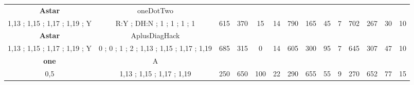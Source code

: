 \begin{table}[]
{\begin{tabular}{|c|c|c|c|c|c|c|c|c|c|c|c|c|c|}
\cellcolor{blue!15}\textbf{Astar} & oneDotTwo& {\color[HTML]{00009B} } & {\color[HTML]{9A0000} } & {\color[HTML]{009901} } &  & {\color[HTML]{00009B} } & {\color[HTML]{9A0000} } & {\color[HTML]{009901} } &  & {\color[HTML]{00009B} } & {\color[HTML]{9A0000} } & {\color[HTML]{009901} } &  \\ 
\cellcolor{ blue!15}1,13 ; 1,15 ; 1,17 ; 1,19 ; Y & R:Y ; DH:N ; 1 ; 1 ; 1 ; 1 & \multirow{-2}{*}{{\color[HTML]{00009B} 615}} & \multirow{-2}{*}{{\color[HTML]{9A0000} 370}} & \multirow{-2}{*}{{\color[HTML]{009901} 15}} & \multirow{-2}{*}{14} & \multirow{-2}{*}{{\color[HTML]{00009B} 790}} & \multirow{-2}{*}{{\color[HTML]{9A0000} 165}} & \multirow{-2}{*}{{\color[HTML]{009901} 45}} & \multirow{-2}{*}{7} & \multirow{-2}{*}{{\color[HTML]{00009B} 702}} & \multirow{-2}{*}{{\color[HTML]{9A0000} 267}} & \multirow{-2}{*}{{\color[HTML]{009901} 30}} & \multirow{-2}{*}{10} \\ \hline

\cellcolor{blue!15}\textbf{Astar} & AplusDiagHack& {\color[HTML]{00009B} } & {\color[HTML]{9A0000} } & {\color[HTML]{009901} } &  & {\color[HTML]{00009B} } & {\color[HTML]{9A0000} } & {\color[HTML]{009901} } &  & {\color[HTML]{00009B} } & {\color[HTML]{9A0000} } & {\color[HTML]{009901} } &  \\ 
\cellcolor{ blue!15}1,13 ; 1,15 ; 1,17 ; 1,19 ; Y & 0 ; 0 ; 1 ; 2 ; 1,13 ; 1,15 ; 1,17 ; 1,19 & \multirow{-2}{*}{{\color[HTML]{00009B} 685}} & \multirow{-2}{*}{{\color[HTML]{9A0000} 315}} & \multirow{-2}{*}{{\color[HTML]{009901} 0}} & \multirow{-2}{*}{14} & \multirow{-2}{*}{{\color[HTML]{00009B} 605}} & \multirow{-2}{*}{{\color[HTML]{9A0000} 300}} & \multirow{-2}{*}{{\color[HTML]{009901} 95}} & \multirow{-2}{*}{7} & \multirow{-2}{*}{{\color[HTML]{00009B} 645}} & \multirow{-2}{*}{{\color[HTML]{9A0000} 307}} & \multirow{-2}{*}{{\color[HTML]{009901} 47}} & \multirow{-2}{*}{10} \\ \hline

\cellcolor{blue!15}\textbf{one} & A& {\color[HTML]{00009B} } & {\color[HTML]{9A0000} } & {\color[HTML]{009901} } &  & {\color[HTML]{00009B} } & {\color[HTML]{9A0000} } & {\color[HTML]{009901} } &  & {\color[HTML]{00009B} } & {\color[HTML]{9A0000} } & {\color[HTML]{009901} } &  \\ 
\cellcolor{ blue!15}0,5 & 1,13 ; 1,15 ; 1,17 ; 1,19 & \multirow{-2}{*}{{\color[HTML]{00009B} 250}} & \multirow{-2}{*}{{\color[HTML]{9A0000} 650}} & \multirow{-2}{*}{{\color[HTML]{009901} 100}} & \multirow{-2}{*}{22} & \multirow{-2}{*}{{\color[HTML]{00009B} 290}} & \multirow{-2}{*}{{\color[HTML]{9A0000} 655}} & \multirow{-2}{*}{{\color[HTML]{009901} 55}} & \multirow{-2}{*}{9} & \multirow{-2}{*}{{\color[HTML]{00009B} 270}} & \multirow{-2}{*}{{\color[HTML]{9A0000} 652}} & \multirow{-2}{*}{{\color[HTML]{009901} 77}} & \multirow{-2}{*}{15} \\ \hline


\end{tabular}}
\end{table}
